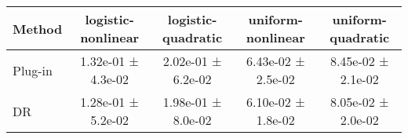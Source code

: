 \begin{tabular}{lcccc}
\toprule
Method & logistic-nonlinear & logistic-quadratic & uniform-nonlinear & uniform-quadratic \\
\midrule
Plug-in & 1.32e-01 ± 4.3e-02 & 2.02e-01 ± 6.2e-02 & 6.43e-02 ± 2.5e-02 & 8.45e-02 ± 2.1e-02 \\
DR & 1.28e-01 ± 5.2e-02 & 1.98e-01 ± 8.0e-02 & 6.10e-02 ± 1.8e-02 & 8.05e-02 ± 2.0e-02 \\
\bottomrule
\end{tabular}
